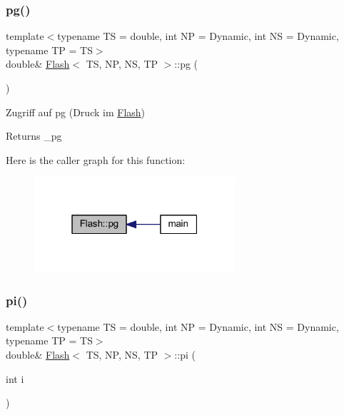 \subsubsection{\texorpdfstring{pg()}{pg()}}
{\footnotesize\ttfamily template$<$typename TS = double, int NP = Dynamic, int NS = Dynamic, typename TP = TS$>$ \\
double\& \mbox{\hyperlink{class_flash}{Flash}}$<$ TS, NP, NS, TP $>$\+::pg (\begin{DoxyParamCaption}{ }\end{DoxyParamCaption})\hspace{0.3cm}{\ttfamily [inline]}}



Zugriff auf pg (Druck im \mbox{\hyperlink{class_flash}{Flash}}) 

\begin{DoxyReturn}{Returns}
\+\_\+pg 
\end{DoxyReturn}
Here is the caller graph for this function\+:
\nopagebreak
\begin{figure}[H]
\begin{center}
\leavevmode
\includegraphics[width=211pt]{class_flash_ac3cec3cdb03bd71e7b32d7e77a209308_icgraph}
\end{center}
\end{figure}
\mbox{\label{class_flash_ae54dbc3d5d7b87c854a765e9b5f4e519}} 
\subsubsection{\texorpdfstring{pi()}{pi()}}
{\footnotesize\ttfamily template$<$typename TS = double, int NP = Dynamic, int NS = Dynamic, typename TP = TS$>$ \\
double\& \mbox{\hyperlink{class_flash}{Flash}}$<$ TS, NP, NS, TP $>$\+::pi (\begin{DoxyParamCaption}\item[{int}]{i }\end{DoxyParamCaption})\hspace{0.3cm}{\ttfamily [inline]}}

